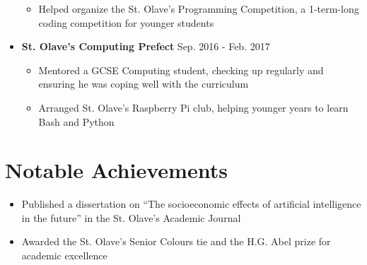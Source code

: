 \documentclass[11pt,a4paper,sans]{moderncv}        %
\begin{document}
\begin{itemize}
\begin{itemize}
\vspace{3pt}

\item Helped organize the St. Olave’s Programming Competition, a 1-term-long coding competition for younger
students

\end{itemize}

\vspace{6pt}

\item \textbf{St. Olave’s Computing Prefect} \hfill Sep. 2016 - Feb. 2017

\begin{itemize}

\vspace{3pt}

\item Mentored a GCSE Computing student, checking up regularly and ensuring he was coping well with the curriculum

\vspace{3pt}

\item Arranged St. Olave’s Raspberry Pi club, helping younger years to learn Bash and Python

\end{itemize}

\end{itemize}

\section{Notable Achievements}

\begin{itemize}

\item Published a dissertation on “The socioeconomic effects of artificial intelligence in the future” in the St. Olave’s Academic Journal

\item Awarded the St. Olave's Senior Colours tie and the H.G. Abel prize for academic excellence

\end{itemize}

\nocite{*}

\end{document}
